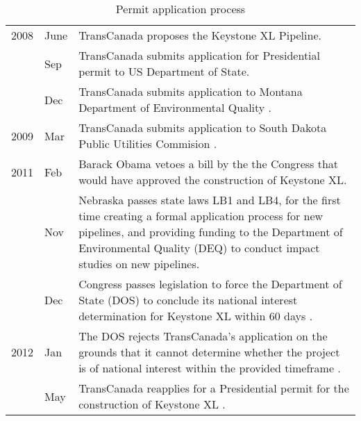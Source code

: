 
\begin{table}[H]
	\caption{Permit application process}

	\begin{tabularx}{\textwidth}{r @{\hspace{0.5\tabcolsep}} l |@{\timeline} X}
		\toprule

		2008 & June & TransCanada proposes the Keystone XL Pipeline.\parnote{\url{https://www.rigzone.com/news/oil_gas/a/149226/TransCanada_Proposes_Second_Oil_Pipeline/}}\\

		 & Sep & TransCanada submits application for Presidential permit to US Department of State\citep{Vann2012}.\\

		 & Dec & TransCanada submits application to Montana Department of Environmental Quality \citep{TransCanadaKeystone2008}.\\

		2009 & Mar & TransCanada submits application to South Dakota Public Utilities Commision \citep{TransCanadaKeystone2009}.\\

		2011 & Feb & Barack Obama vetoes a bill by the the Congress that would have approved the construction of Keystone XL.\parnote{\url{https://www.nbcnews.com/politics/white-house/obama-vetoes-keystone-xl-pipeline-bill-n311671}}\\

		 & Nov & Nebraska passes state laws LB1 and LB4, for the first time creating a formal application process for new pipelines, and providing funding to the Department of Environmental Quality (DEQ) to conduct impact studies on new pipelines.\parnote{\url{http://update.legislature.ne.gov/?p=5458}}\\

		 & Dec & Congress passes legislation to force the Department of State (DOS) to conclude its national interest determination for Keystone XL within 60 days \citep{USDOS2012}.\\

		2012 & Jan & The DOS rejects TransCanada's application on the grounds that it cannot determine whether the project is of national interest within the provided timeframe \citep{USDOS2012}.\\

		 & May & TransCanada reapplies for a Presidential permit for the construction of Keystone XL \citep{DoS2015}.\\


\end{tabularx}
\end{table}
